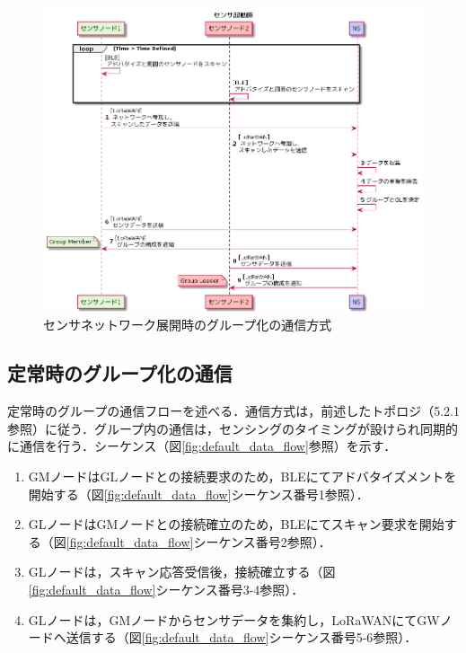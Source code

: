 \begin{figure}[]
    \begin{center}
    \includegraphics[width=15cm]{figures/v2.0/センサ起動時.png}
    \caption{センサネットワーク展開時のグループ化の通信方式}
    \label{fig:group_on_activation}
    \end{center}
\end{figure}

\subsection{定常時のグループ化の通信}
定常時のグループの通信フローを述べる．通信方式は，前述したトポロジ（5.2.1参照）に従う．グループ内の通信は，センシングのタイミングが設けられ同期的に通信を行う．シーケンス（図\ref{fig:default_data_flow}参照）を示す．

\begin{enumerate}
    \item GMノードはGLノードとの接続要求のため，BLEにてアドバタイズメントを開始する（図\ref{fig:default_data_flow}シーケンス番号1参照）．
    \item GLノードはGMノードとの接続確立のため，BLEにてスキャン要求を開始する（図\ref{fig:default_data_flow}シーケンス番号2参照）．
    \item GLノードは，スキャン応答受信後，接続確立する（図\ref{fig:default_data_flow}シーケンス番号3-4参照）．
    \item GLノードは，GMノードからセンサデータを集約し，LoRaWANにてGWノードへ送信する（図\ref{fig:default_data_flow}シーケンス番号5-6参照）．
\end{enumerate}

